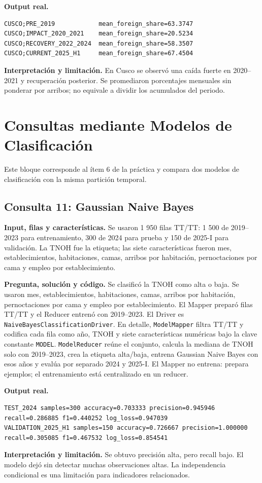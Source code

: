 \documentclass[10pt,a4paper]{article}
\theoremstyle{definition}
\begin{document}
\textbf{Output real.}
\begin{lstlisting}[style=resultado]
CUSCO;PRE_2019            mean_foreign_share=63.3747
CUSCO;IMPACT_2020_2021    mean_foreign_share=20.5234
CUSCO;RECOVERY_2022_2024  mean_foreign_share=58.3507
CUSCO;CURRENT_2025_H1     mean_foreign_share=67.4504
\end{lstlisting}
\textbf{Interpretación y limitación.} En Cusco se observó una caída fuerte en
2020--2021 y recuperación posterior. Se promediaron porcentajes mensuales sin
ponderar por arribos; no equivale a dividir los acumulados del periodo.

\section{Consultas mediante Modelos de Clasificación}
Este bloque corresponde al ítem 6 de la práctica y compara dos modelos de
clasificación con la misma partición temporal.
\subsection{Consulta 11: Gaussian Naive Bayes}
\textbf{Input, filas y características.} Se usaron 1 950 filas TT/TT: 1 500 de
2019--2023 para entrenamiento, 300 de 2024 para prueba y 150 de 2025-I para
validación. La TNOH fue la etiqueta; las siete características fueron mes,
establecimientos, habitaciones, camas, arribos por habitación, pernoctaciones
por cama y empleo por establecimiento.

\textbf{Pregunta, solución y código.} Se clasificó la TNOH como alta o baja. Se
usaron mes, establecimientos, habitaciones, camas, arribos por habitación,
pernoctaciones por cama y empleo por establecimiento. El Mapper preparó filas
TT/TT y el Reducer entrenó con 2019--2023. El Driver es
\texttt{NaiveBayesClassificationDriver}. En detalle, \texttt{ModelMapper} filtra
TT/TT y codifica cada fila como año, TNOH y siete características numéricas bajo
la clave constante \texttt{MODEL}. \texttt{ModelReducer} reúne el conjunto,
calcula la mediana de TNOH solo con 2019--2023, crea la etiqueta alta/baja,
entrena Gaussian Naive Bayes con esos años y evalúa por separado 2024 y 2025-I.
El Mapper no entrena: prepara ejemplos; el entrenamiento está centralizado en
un reducer.

\textbf{Output real.}
\begin{lstlisting}[style=resultado]
TEST_2024 samples=300 accuracy=0.703333 precision=0.945946 recall=0.286885 f1=0.440252 log_loss=0.947039
VALIDATION_2025_H1 samples=150 accuracy=0.726667 precision=1.000000 recall=0.305085 f1=0.467532 log_loss=0.854541
\end{lstlisting}
\textbf{Interpretación y limitación.} Se obtuvo precisión alta, pero recall
bajo. El modelo dejó sin detectar muchas observaciones altas. La independencia
condicional es una limitación para indicadores relacionados.
\end{document}

